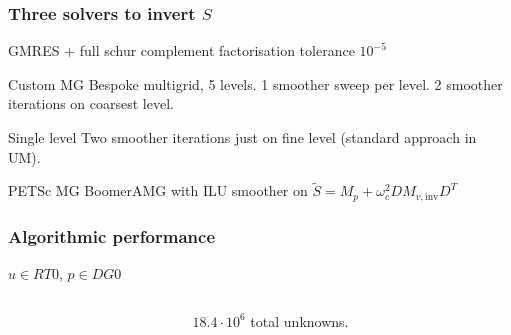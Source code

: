 \documentclass[presentation]{beamer}
\begin{document}
\begin{frame}
  \frametitle{Three solvers to invert $S$}
  GMRES + full schur complement factorisation tolerance $10^{-5}$

  \begin{block}{Custom MG}
    Bespoke multigrid, 5 levels.  1 smoother sweep per level.  2
    smoother iterations on coarsest level.
  \end{block}

  \begin{block}{Single level}
    Two smoother iterations just on fine level (standard approach in UM).
  \end{block}

  \begin{block}{PETSc MG}
    BoomerAMG with ILU smoother on $\tilde{S} = M_p +  \omega_c^2 D M_{v,\text{inv}} D^T$
  \end{block}
\end{frame}
\begin{frame}
  \frametitle{Algorithmic performance}

  $u \in RT0$, $p \in DG0$
  \begin{columns}
    \begin{column}{0.75\textwidth}
    \end{column}
    \begin{column}{0.25\textwidth}
      $18.4\cdot 10^6$ total unknowns.
    \end{column}
  \end{columns}
\end{frame}
\end{document}
